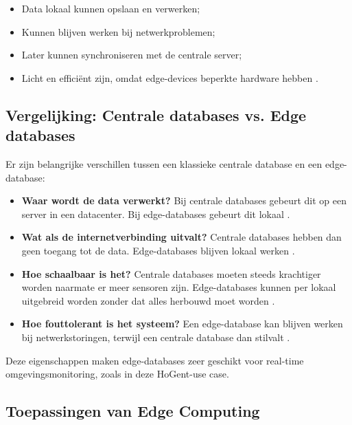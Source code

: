\begin{itemize}
    \item Data lokaal kunnen opslaan en verwerken;
    \item Kunnen blijven werken bij netwerkproblemen;
    \item Later kunnen synchroniseren met de centrale server;
    \item Licht en efficiënt zijn, omdat edge-devices beperkte hardware hebben \autocite{Taheri2020}.
\end{itemize}

\subsection{Vergelijking: Centrale databases vs. Edge databases}
\label{sec:vergelijking-databases}

Er zijn belangrijke verschillen tussen een klassieke centrale database en een edge-database:

\begin{itemize}
    \item \textbf{Waar wordt de data verwerkt?}  
    Bij centrale databases gebeurt dit op een server in een datacenter. Bij edge-databases gebeurt dit lokaal \autocite{Shi2016}.

    \item \textbf{Wat als de internetverbinding uitvalt?}  
    Centrale databases hebben dan geen toegang tot de data. Edge-databases blijven lokaal werken \autocite{Rahmani2018}.

    \item \textbf{Hoe schaalbaar is het?}  
    Centrale databases moeten steeds krachtiger worden naarmate er meer sensoren zijn. Edge-databases kunnen per lokaal uitgebreid worden zonder dat alles herbouwd moet worden \autocite{Taheri2020}.

    \item \textbf{Hoe fouttolerant is het systeem?}  
    Een edge-database kan blijven werken bij netwerkstoringen, terwijl een centrale database dan stilvalt \autocite{Rahmani2018}.
\end{itemize}

Deze eigenschappen maken edge-databases zeer geschikt voor real-time omgevingsmonitoring, zoals in deze HoGent-use case.

\subsection{Toepassingen van Edge Computing}

